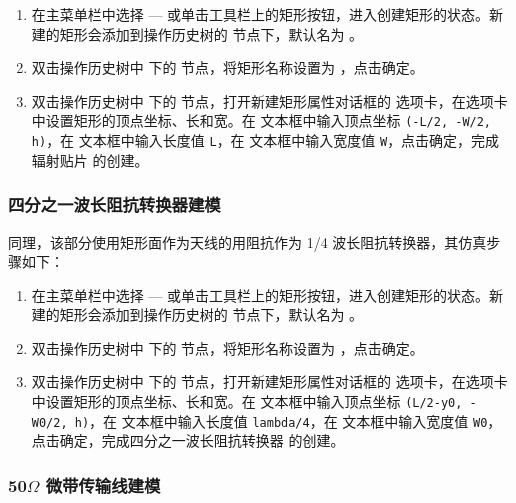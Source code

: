\documentclass[12pt,a4paper,UTF8]{article}
\begin{document}
\begin{enumerate}
    \item 在主菜单栏中选择 — 或单击工具栏上的矩形按钮，进入创建矩形的状态。新建的矩形会添加到操作历史树的  节点下，默认名为 。
    
    \item 双击操作历史树中  下的  节点，将矩形名称设置为 ，点击确定。
    
    \item 双击操作历史树中  下的  节点，打开新建矩形属性对话框的  选项卡，在选项卡中设置矩形的顶点坐标、长和宽。在  文本框中输入顶点坐标 \texttt{(-L/2, -W/2, h)}，在  文本框中输入长度值 \texttt{L}，在  文本框中输入宽度值 \texttt{W}，点击确定，完成辐射贴片  的创建。
\end{enumerate}

\subsubsection{四分之一波长阻抗转换器建模}

同理，该部分使用矩形面作为天线的用阻抗作为 1/4 波长阻抗转换器，其仿真步骤如下：

\begin{enumerate}
    \item 在主菜单栏中选择 — 或单击工具栏上的矩形按钮，进入创建矩形的状态。新建的矩形会添加到操作历史树的  节点下，默认名为 。
    
    \item 双击操作历史树中  下的  节点，将矩形名称设置为 ，点击确定。
    
    \item 双击操作历史树中  下的  节点，打开新建矩形属性对话框的  选项卡，在选项卡中设置矩形的顶点坐标、长和宽。在  文本框中输入顶点坐标 \texttt{(L/2-y0, -W0/2, h)}，在  文本框中输入长度值 \texttt{lambda/4}，在  文本框中输入宽度值 \texttt{W0}，点击确定，完成四分之一波长阻抗转换器  的创建。
\end{enumerate}

\subsubsection{50$\Omega$ 微带传输线建模}
\end{document}
